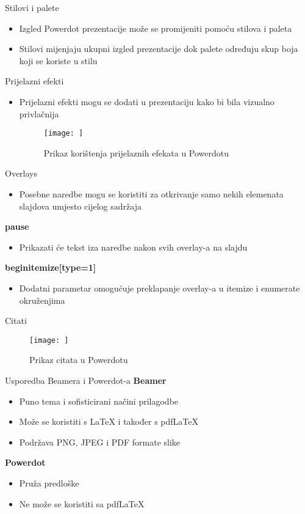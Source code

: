 \documentclass{beamer}
\begin{document}
\begin{frame}{Stilovi i palete}
\begin{itemize}
    \item Izgled Powerdot prezentacije može se promijeniti pomoću stilova i paleta
    \item Stilovi mijenjaju ukupni izgled prezentacije dok palete određuju skup boja koji se koriste u stilu
\end{itemize}
\end{frame}
\begin{frame}{Prijelazni efekti}
\begin{itemize}
    \item Prijelazni efekti mogu se dodati u prezentaciju kako bi bila vizualno privlačnija
\begin{figure}
	\texttt{[image: ]}
	\caption{Prikaz korištenja prijelaznih efekata u Powerdotu}
\end{figure}
\end{itemize}
\end{frame}

\begin{frame}{Overlays}
 
 \begin{itemize}
    \item Posebne naredbe mogu se koristiti za otkrivanje samo nekih elemenata slajdova umjesto cijelog sadržaja
\end{itemize}
\textbf{pause}
\begin{itemize}
    \item Prikazati će tekst iza naredbe nakon svih overlay-a na slajdu 
\end{itemize}
\textbf{begin{itemize}[type=1]}
\begin{itemize}
    \item Dodatni parametar omogućuje preklapanje overlay-a u itemize i enumerate okruženjima
\end{itemize}
\end{frame}
\begin{frame}{Citati}
\begin{figure}
	\texttt{[image: ]}
	\caption{Prikaz citata u Powerdotu}
\end{figure}   
\end{frame}
\begin{frame}{Usporedba Beamera i Powerdot-a}
\textbf{Beamer}
\begin{itemize}
    \item Puno tema i sofisticirani načini prilagodbe
    \item Može se koristiti s LaTeX i također s pdfLaTeX
    \item Podržava PNG, JPEG i PDF formate slike
\end{itemize}
\textbf{Powerdot}
\begin{itemize}
    \item Pruža predloške
    \item Ne može se koristiti sa pdfLaTeX
\end{itemize}
\end{frame}
\end{document}
